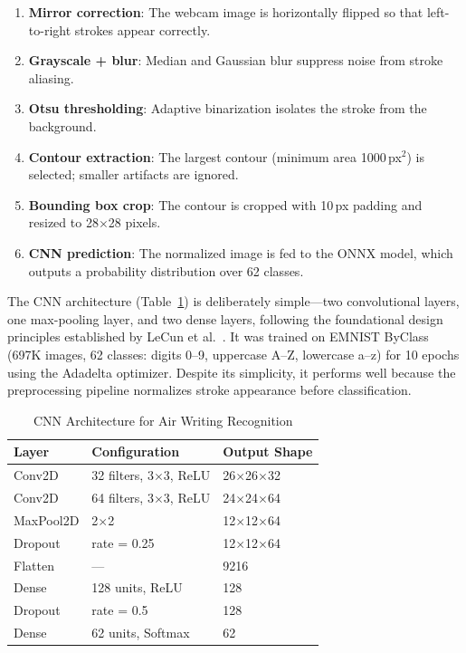 \documentclass[conference]{IEEEtran}
\begin{document}
\begin{enumerate}[leftmargin=*]
    \item \textbf{Mirror correction}: The webcam image is horizontally flipped so that left-to-right strokes appear correctly.
    \item \textbf{Grayscale + blur}: Median and Gaussian blur suppress noise from stroke aliasing.
    \item \textbf{Otsu thresholding}: Adaptive binarization isolates the stroke from the background.
    \item \textbf{Contour extraction}: The largest contour (minimum area 1000\,px$^2$) is selected; smaller artifacts are ignored.
    \item \textbf{Bounding box crop}: The contour is cropped with 10\,px padding and resized to 28$\times$28 pixels.
    \item \textbf{CNN prediction}: The normalized image is fed to the ONNX model, which outputs a probability distribution over 62 classes.
\end{enumerate}

The CNN architecture (Table~\ref{tab:cnn}) is deliberately simple---two convolutional layers, one max-pooling layer, and two dense layers, following the foundational design principles established by LeCun et al.~\cite{lecun1998}. It was trained on EMNIST ByClass (697K images, 62 classes: digits 0--9, uppercase A--Z, lowercase a--z) for 10 epochs using the Adadelta optimizer. Despite its simplicity, it performs well because the preprocessing pipeline normalizes stroke appearance before classification.

\begin{table}[htbp]
\caption{CNN Architecture for Air Writing Recognition}
\label{tab:cnn}
\centering
\begin{tabular}{@{}lll@{}}
\toprule
\textbf{Layer} & \textbf{Configuration} & \textbf{Output Shape} \\
\midrule
Conv2D & 32 filters, 3$\times$3, ReLU & 26$\times$26$\times$32 \\
Conv2D & 64 filters, 3$\times$3, ReLU & 24$\times$24$\times$64 \\
MaxPool2D & 2$\times$2 & 12$\times$12$\times$64 \\
Dropout & rate = 0.25 & 12$\times$12$\times$64 \\
Flatten & --- & 9216 \\
Dense & 128 units, ReLU & 128 \\
Dropout & rate = 0.5 & 128 \\
Dense & 62 units, Softmax & 62 \\
\bottomrule
\end{tabular}
\end{table}
\end{document}
